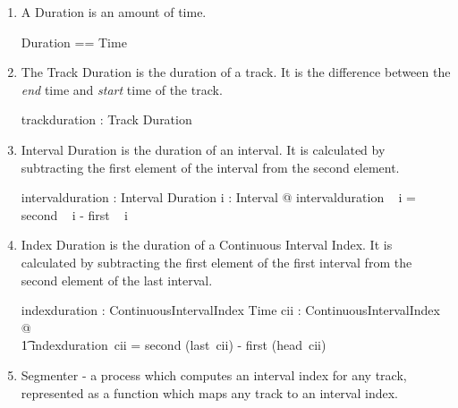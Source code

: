 \documentclass[11pt]{article}
\begin{document}
\begin{enumerate}

\begin{zed}
	ContinuousIntervalIndex == \\
	\t1 \{ ii : IntervalIndex;  i_j, 
	i_{j+1}: Interval  |   \\
	\t3 \langle i_j, i_{j+1} \rangle \inseq ii \implies  second ~ i_j \geq first ~ i_{j+1}@ ii \}
\end{zed}


\item A \textsf{Duration} is an amount of time. 

\begin{zed}
	Duration == Time
\end{zed}

\item The \textsf{Track Duration} is the duration of a track. It is the difference between the \emph{end} time and \emph{start} time of the track. 

\begin{axdef}
	trackduration : Track \fun Duration 
\end{axdef}

\item \textsf{Interval Duration} is the duration of an interval. It is calculated by subtracting the first element of the interval from the second element. 

\begin{axdef}
	intervalduration : Interval \fun Duration 
\where
	\forall i : Interval @ intervalduration ~ i = second ~ i - first ~ i 
\end{axdef}


\item \textsf{Index Duration} is the duration of a Continuous Interval Index. It is calculated by subtracting the first element of the first interval from the second element of the last interval. 


\begin{axdef}
	indexduration : ContinuousIntervalIndex \fun Time 
\where
\forall cii : ContinuousIntervalIndex @ \\
\t1		indexduration~cii = second (last~cii) - first (head~cii) 
\end{axdef} 

\item \textsf{Segmenter} - a process which computes an interval index  for any track, represented as a function which maps any track to an interval index.


\end{enumerate}
\end{document}
